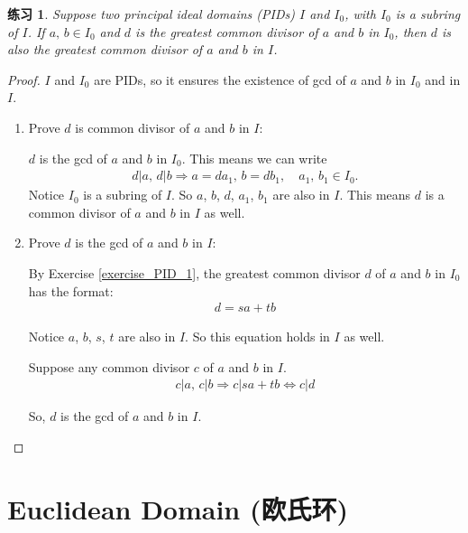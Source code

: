 \documentclass[utf8]{ctexbook}
\newtheorem{exercise}{练习}[section]
\begin{document}
\begin{exercise}
Suppose two principal ideal domains (PIDs) $I$ and $I_0$, with $I_0$ is a subring of $I$. If $a, \, b \in I_0$ and $d$ is the greatest common divisor of $a$ and $b$ in $I_0$, then $d$ is also the greatest common divisor of $a$ and $b$ in $I$.
\end{exercise}

\begin{proof}
$I$ and $I_0$ are PIDs, so it ensures the existence of gcd of $a$ and $b$ in $I_0$ and in $I$. 

\begin{enumerate}

\item{Prove $d$ is common divisor of $a$ and $b$ in $I$: 

$d$ is the gcd of $a$ and $b$ in $I_0$. This means we can write
\begin{align*}
d | a, \, d | b \Longrightarrow a = d a_1, \, b = d b_1, \quad a_1, \, b_1 \in I_0 .
\end{align*}
Notice $I_0$ is a subring of $I$. So $a$, $b$, $d$, $a_1$, $b_1$ are also in $I$. This means $d$ is a common divisor of $a$ and $b$ in $I$ as well.
}
\item{Prove $d$ is the gcd of $a$ and $b$ in $I$:

By Exercise \ref{exercise_PID_1}, the greatest common divisor $d$ of $a$ and $b$ in $I_0$ has the format:
\begin{align*}
d = s a + t b
\end{align*}

Notice $a$, $b$, $s$, $t$ are also in $I$. So this equation holds in $I$ as well. 

Suppose any common divisor $c$ of $a$ and $b$ in $I$. 
\begin{align*}
c | a ,\, c | b \Longrightarrow c | sa + t b \Longleftrightarrow c | d
\end{align*} 

So, $d$ is the gcd of $a$ and $b$ in $I$.
}
\end{enumerate}


\end{proof}

\section{Euclidean Domain (欧氏环)}
\end{document}
